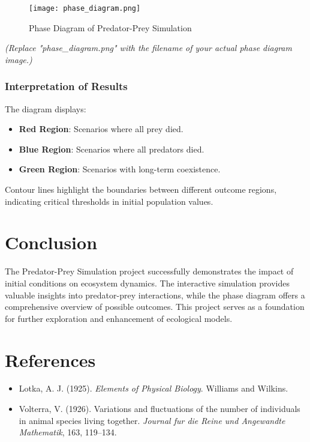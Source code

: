 \documentclass[12pt]{article}
\begin{document}
\begin{figure}[H]
    \centering
    \texttt{[image: phase\_diagram.png]}
    \caption{Phase Diagram of Predator-Prey Simulation}
    \label{fig:phase_diagram}
\end{figure}

\textit{(Replace "phase\_diagram.png" with the filename of your actual phase diagram image.)}

\subsubsection{Interpretation of Results}
The diagram displays:

\begin{itemize}
    \item \textbf{Red Region}: Scenarios where all prey died.
    \item \textbf{Blue Region}: Scenarios where all predators died.
    \item \textbf{Green Region}: Scenarios with long-term coexistence.
\end{itemize}

Contour lines highlight the boundaries between different outcome regions, indicating critical thresholds in initial population values.

\section{Conclusion}
The Predator-Prey Simulation project successfully demonstrates the impact of initial conditions on ecosystem dynamics. The interactive simulation provides valuable insights into predator-prey interactions, while the phase diagram offers a comprehensive overview of possible outcomes. This project serves as a foundation for further exploration and enhancement of ecological models.

\section*{References}
\begin{itemize}
    \item Lotka, A. J. (1925). \textit{Elements of Physical Biology}. Williams and Wilkins.
    \item Volterra, V. (1926). Variations and fluctuations of the number of individuals in animal species living together. \textit{Journal fur die Reine und Angewandte Mathematik}, 163, 119–134.
\end{itemize}
\end{document}

